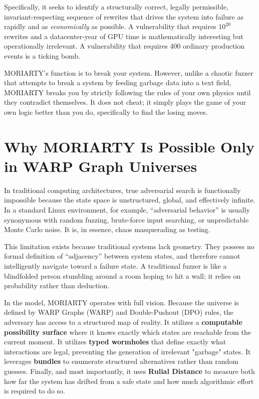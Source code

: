 Specifically, it seeks to identify a structurally correct, legally permissible, invariant-respecting sequence of rewrites that drives the system into failure as rapidly and as \emph{economically} as possible. A vulnerability that requires $10^{20}$ rewrites and a datacenter-year of GPU time is mathematically interesting but operationally irrelevant. A vulnerability that requires 400 ordinary production events is a ticking bomb.

MORIARTY’s function is to break your system. However, unlike a chaotic fuzzer that attempts to break a system by feeding garbage data into a text field, MORIARTY breaks you by strictly following the rules of your own physics until they contradict themselves. It does not cheat; it simply plays the game of your own logic better than you do, specifically to find the losing moves.

\section{Why MORIARTY Is Possible Only in WARP Graph Universes}

In traditional computing architectures, true adversarial search is functionally impossible because the state space is unstructured, global, and effectively infinite. In a standard Linux environment, for example, ``adversarial behavior'' is usually synonymous with random fuzzing, brute-force input searching, or unpredictable Monte Carlo noise. It is, in essence, chaos masquerading as testing.

This limitation exists because traditional systems lack geometry. They possess no formal definition of ``adjacency'' between system states, and therefore cannot intelligently navigate toward a failure state. A traditional fuzzer is like a blindfolded person stumbling around a room hoping to hit a wall; it relies on probability rather than deduction.

In the \COMPUTER{} model, MORIARTY operates with full vision. Because the universe is defined by WARP Graphs (WARP) and Double-Pushout (DPO) rules, the adversary has access to a structured map of reality. It utilizes a \textbf{computable possibility surface} where it knows exactly which states are reachable from the current moment. It utilizes \textbf{typed wormholes} that define exactly what interactions are legal, preventing the generation of irrelevant "garbage" states. It leverages \textbf{bundles} to enumerate structured alternatives rather than random guesses. Finally, and most importantly, it uses \textbf{Rulial Distance} to measure both how far the system has drifted from a safe state and how much algorithmic effort is required to do so.

